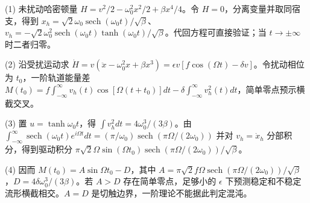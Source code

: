 (1) 未扰动哈密顿量 $H=v^2/2-\omega_0^2x^2/2+\beta x^4/4$。令 $H=0$，分离变量并取同宿支，得到 $x_h=\sqrt2\omega_0\operatorname{sech}(\omega_0t)/\sqrt\beta$、$v_h=-\sqrt2\omega_0^2\operatorname{sech}(\omega_0t)\tanh(\omega_0t)/\sqrt\beta$。代回方程可直接验证；当 $t\to\pm\infty$ 时二者归零。

(2) 沿受扰运动求 $\dot H=v(\ddot x-\omega_0^2x+\beta x^3)=\epsilon v[f\cos(\Omega t)-\delta v]$。令扰动相位为 $t_0$，一阶轨道能量差 $M(t_0)=f\int_{-\infty}^{\infty}v_h(t)\cos[\Omega(t+t_0)]dt-\delta\int_{-\infty}^{\infty}v_h^2(t)dt$，简单零点预示横截交叉。

(3) 置 $u=\tanh\omega_0t$，得 $\int v_h^2dt=4\omega_0^3/(3\beta)$。由 $\int_{-\infty}^{\infty}\operatorname{sech}(\omega_0t)e^{i\Omega t}dt=(\pi/\omega_0)\operatorname{sech}(\pi\Omega/(2\omega_0))$ 并对 $v_h=\dot x_h$ 分部积分，得到驱动积分 $\pi\sqrt2\Omega\sin(\Omega t_0)\operatorname{sech}(\pi\Omega/(2\omega_0))/\sqrt\beta$。

(4) 因而 $M(t_0)=A\sin\Omega t_0-D$，其中 $A=\pi\sqrt2 f\Omega\operatorname{sech}(\pi\Omega/(2\omega_0))/\sqrt\beta$，$D=4\delta\omega_0^3/(3\beta)$。若 $A>D$ 存在简单零点，足够小的 $\epsilon$ 下预测稳定和不稳定流形横截相交。$A=D$ 是切触边界，一阶理论不能据此判定混沌。
